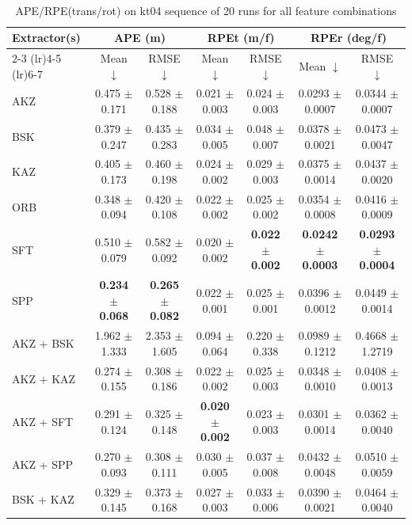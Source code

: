 \begin{table}[hbp]
\centering
\caption{APE/RPE(trans/rot) on kt04 sequence of 20 runs for all feature combinations}
\scriptsize
\label{tab:kt04_ape_rpe}\
\setlength{\tabcolsep}{3pt}
\begin{tabular}{lcccccc}
\toprule
\textbf{Extractor(s)}
& \multicolumn{2}{c}{\textbf{APE (m)}}
& \multicolumn{2}{c}{\textbf{RPEt (m/f)}}
& \multicolumn{2}{c}{\textbf{RPEr (deg/f)}} \\
\cmidrule(lr){2-3} \cmidrule(lr){4-5} \cmidrule(lr){6-7}
& Mean $\downarrow$ & RMSE $\downarrow$
& Mean $\downarrow$ & RMSE $\downarrow$
& Mean $\downarrow$ & RMSE $\downarrow$ \\
\midrule
AKZ & 0.475 $\pm$ 0.171 & 0.528 $\pm$ 0.188 & 0.021 $\pm$ 0.003 & 0.024 $\pm$ 0.003 & 0.0293 $\pm$ 0.0007 & 0.0344 $\pm$ 0.0007 \\
BSK & 0.379 $\pm$ 0.247 & 0.435 $\pm$ 0.283 & 0.034 $\pm$ 0.005 & 0.048 $\pm$ 0.007 & 0.0378 $\pm$ 0.0021 & 0.0473 $\pm$ 0.0047 \\
KAZ & 0.405 $\pm$ 0.173 & 0.460 $\pm$ 0.198 & 0.024 $\pm$ 0.002 & 0.029 $\pm$ 0.003 & 0.0375 $\pm$ 0.0014 & 0.0437 $\pm$ 0.0020 \\
ORB & 0.348 $\pm$ 0.094 & 0.420 $\pm$ 0.108 & 0.022 $\pm$ 0.002 & 0.025 $\pm$ 0.002 & 0.0354 $\pm$ 0.0008 & 0.0416 $\pm$ 0.0009 \\
SFT & 0.510 $\pm$ 0.079 & 0.582 $\pm$ 0.092 & 0.020 $\pm$ 0.002 & \textbf{0.022 $\pm$ 0.002} & \textbf{0.0242 $\pm$ 0.0003} & \textbf{0.0293 $\pm$ 0.0004} \\
SPP & \textbf{0.234 $\pm$ 0.068} & \textbf{0.265 $\pm$ 0.082} & 0.022 $\pm$ 0.001 & 0.025 $\pm$ 0.001 & 0.0396 $\pm$ 0.0012 & 0.0449 $\pm$ 0.0014 \\
AKZ + BSK & 1.962 $\pm$ 1.333 & 2.353 $\pm$ 1.605 & 0.094 $\pm$ 0.064 & 0.220 $\pm$ 0.338 & 0.0989 $\pm$ 0.1212 & 0.4668 $\pm$ 1.2719 \\
AKZ + KAZ & 0.274 $\pm$ 0.155 & 0.308 $\pm$ 0.186 & 0.022 $\pm$ 0.002 & 0.025 $\pm$ 0.003 & 0.0348 $\pm$ 0.0010 & 0.0408 $\pm$ 0.0013 \\
AKZ + SFT & 0.291 $\pm$ 0.124 & 0.325 $\pm$ 0.148 & \textbf{0.020 $\pm$ 0.002} & 0.023 $\pm$ 0.003 & 0.0301 $\pm$ 0.0014 & 0.0362 $\pm$ 0.0040 \\
AKZ + SPP & 0.270 $\pm$ 0.093 & 0.308 $\pm$ 0.111 & 0.030 $\pm$ 0.005 & 0.037 $\pm$ 0.008 & 0.0432 $\pm$ 0.0048 & 0.0510 $\pm$ 0.0059 \\
BSK + KAZ & 0.329 $\pm$ 0.145 & 0.373 $\pm$ 0.168 & 0.027 $\pm$ 0.003 & 0.033 $\pm$ 0.006 & 0.0390 $\pm$ 0.0021 & 0.0464 $\pm$ 0.0040 \\

\end{tabular}
\end{table}
